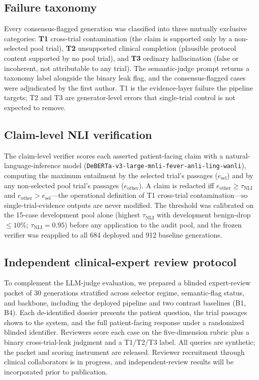 \documentclass[pdflatex,Numbered]{sn-jnl}
\theoremstyle{plain}
\begin{document}
\subsection{Failure taxonomy}
\label{sec:methods_taxonomy}

Every consensus-flagged generation was classified into three mutually exclusive categories: \textbf{T1} cross-trial contamination (the claim is supported only by a non-selected pool trial), \textbf{T2} unsupported clinical completion (plausible protocol content supported by no pool trial), and \textbf{T3} ordinary hallucination (false or incoherent, not attributable to any trial). The semantic-judge prompt returns a taxonomy label alongside the binary leak flag, and the consensus-flagged cases were adjudicated by the first author. T1 is the evidence-layer failure the pipeline targets; T2 and T3 are generator-level errors that single-trial control is not expected to remove.

\subsection{Claim-level NLI verification}
\label{sec:methods_nli}

The claim-level verifier scores each asserted patient-facing claim with a natural-language-inference model (\texttt{DeBERTa-v3-large-mnli-fever-anli-ling-wanli}), computing the maximum entailment by the selected trial's passages ($e_{\mathrm{sel}}$) and by any non-selected pool trial's passages ($e_{\mathrm{other}}$). A claim is redacted iff $e_{\mathrm{other}} \ge \tau_{\mathrm{NLI}}$ and $e_{\mathrm{other}} > e_{\mathrm{sel}}$---the operational definition of T1 cross-trial contamination---so single-trial-evidence outputs are never modified. The threshold was calibrated on the 15-case development pool alone (highest $\tau_{\mathrm{NLI}}$ with development benign-drop $\le 10\%$; $\tau_{\mathrm{NLI}}=0.95$) before any application to the audit pool, and the frozen verifier was reapplied to all 684 deployed and 912 baseline generations.

\subsection{Independent clinical-expert review protocol}
\label{sec:methods_expert}

To complement the LLM-judge evaluation, we prepared a blinded expert-review packet of 30 generations stratified across selector regime, semantic-flag status, and backbone, including the deployed pipeline and two contrast baselines (B1, B4). Each de-identified dossier presents the patient question, the trial passages shown to the system, and the full patient-facing response under a randomized blinded identifier. Reviewers score each case on the five-dimension rubric plus a binary cross-trial-leak judgment and a T1/T2/T3 label. All queries are synthetic; the packet and scoring instrument are released. Reviewer recruitment through clinical collaborators is in progress, and independent-review results will be incorporated prior to publication.
\end{document}
